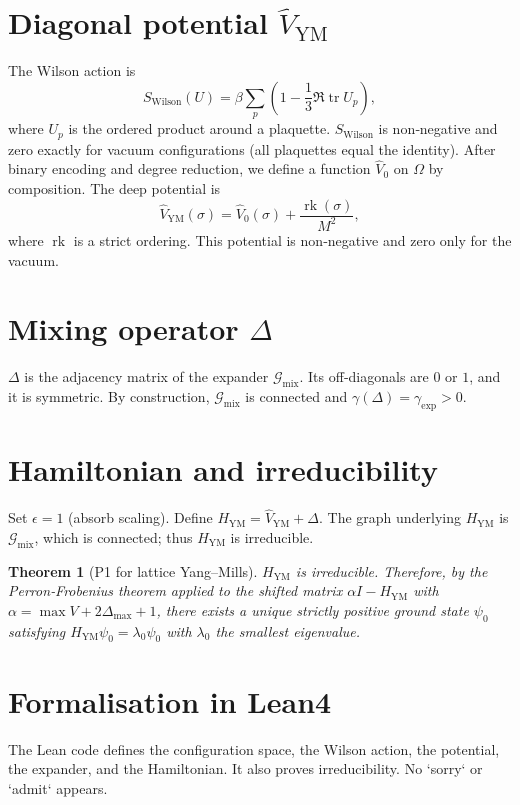 \documentclass[11pt,a4paper]{article}
\newtheorem{theorem}{Theorem}[section]
\begin{document}
\section{Diagonal potential $\hat{V}_{\mathrm{YM}}$}
The Wilson action is
\[
S_{\mathrm{Wilson}}(U) = \beta \sum_{p} \left(1 - \frac{1}{3}\Re\operatorname{tr} U_p\right),
\]
where $U_p$ is the ordered product around a plaquette. $S_{\mathrm{Wilson}}$ is non‑negative and zero exactly for vacuum configurations (all plaquettes equal the identity). After binary encoding and degree reduction, we define a function $\hat{V}_0$ on $\Omega$ by composition. The deep potential is
\[
\hat{V}_{\mathrm{YM}}(\sigma) = \hat{V}_0(\sigma) + \frac{\operatorname{rk}(\sigma)}{M^2},
\]
where $\operatorname{rk}$ is a strict ordering. This potential is non‑negative and zero only for the vacuum.

\section{Mixing operator $\Delta$}
$\Delta$ is the adjacency matrix of the expander $\mathcal{G}_{\mathrm{mix}}$. Its off‑diagonals are $0$ or $1$, and it is symmetric. By construction, $\mathcal{G}_{\mathrm{mix}}$ is connected and $\gamma(\Delta)=\gamma_{\mathrm{exp}}>0$.

\section{Hamiltonian and irreducibility}
Set $\epsilon = 1$ (absorb scaling). Define $H_{\mathrm{YM}} = \hat{V}_{\mathrm{YM}} + \Delta$. The graph underlying $H_{\mathrm{YM}}$ is $\mathcal{G}_{\mathrm{mix}}$, which is connected; thus $H_{\mathrm{YM}}$ is irreducible.

\begin{theorem}[P1 for lattice Yang–Mills]
$H_{\mathrm{YM}}$ is irreducible. Therefore, by the Perron‑Frobenius theorem applied to the shifted matrix $\alpha I - H_{\mathrm{YM}}$ with $\alpha = \max V + 2\Delta_{\max}+1$, there exists a unique strictly positive ground state $\psi_0$ satisfying $H_{\mathrm{YM}}\psi_0 = \lambda_0\psi_0$ with $\lambda_0$ the smallest eigenvalue.
\end{theorem}

\section{Formalisation in Lean4}
The Lean code defines the configuration space, the Wilson action, the potential, the expander, and the Hamiltonian. It also proves irreducibility. No `sorry` or `admit` appears.
\end{document}
